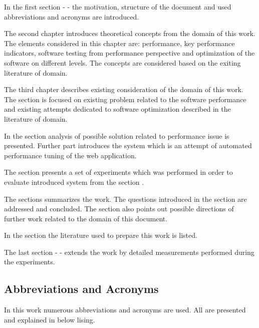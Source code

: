 \documentclass[10pt,a4paper]{article}
\begin{document}
In the first section - \textit{} - the motivation, structure of the document and used abbreviations and acronyms are introduced. 

The second chapter \textit{} introduces theoretical concepts from the domain of this work. The elements considered in this chapter are: performance, key performance indicators, software testing from performance perspective and optimization of the software on different levels. The concepts are considered based on the exiting literature of domain. 
  
The third chapter \textit{} describes existing consideration of the domain of this work. The section is focused on existing problem related to the software performance and existing attempts    dedicated to software optimization described in the literature of domain.

In the section \textit{} analysis of possible solution related to performance issue is presented. Further part introduces the system which is an attempt of automated performance tuning of the web application.

The section \textit{} presents a set of experiments which was performed in order to evaluate introduced system from the section \textit{}. 

The \textit{} sections summarizes the work. The questions introduced in the section \textit{} are addressed and concluded. The section also points out possible directions of further work related to the domain of this document. 

In the section \textit{} the literature used to prepare this work is listed.

The last section - \textit{} - extends the work by detailed measurements performed during the experiments. 

\pagebreak
\subsection{Abbreviations and Acronyms}
In this work numerous abbreviations and acronyms are used. All are presented and explained in below lising.
\end{document}
